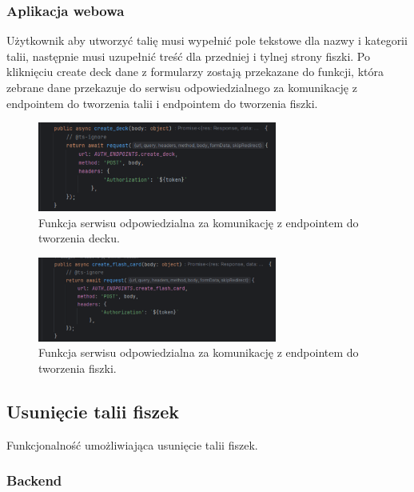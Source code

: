 \subsubsection{Aplikacja webowa}

Użytkownik aby utworzyć talię musi wypełnić pole tekstowe dla nazwy i kategorii talii, następnie musi uzupełnić treść dla przedniej i tylnej strony fiszki. Po kliknięciu create deck dane z formularzy zostają przekazane do funkcji, która zebrane dane przekazuje do serwisu odpowiedzialnego za komunikację z endpointem do tworzenia talii i endpointem do tworzenia fiszki.

\begin{figure}[H]
    \centering
    \includegraphics[width=0.7\textwidth]{chapters/chapter_8/screens/create_deck_web}
    \caption{Funkcja serwisu odpowiedzialna za komunikację z endpointem do tworzenia decku.}
    \label{img:create_deck_web}
\end{figure}

\begin{figure}[H]
    \centering
    \includegraphics[width=0.7\textwidth]{chapters/chapter_8/screens/create_flash_card_web}
    \caption{Funkcja serwisu odpowiedzialna za komunikację z endpointem do tworzenia fiszki.}
    \label{img:create_flash_card_web}
\end{figure}

\subsection{Usunięcie talii fiszek}

Funkcjonalność umożliwiająca usunięcie talii fiszek.

\subsubsection{Backend}

